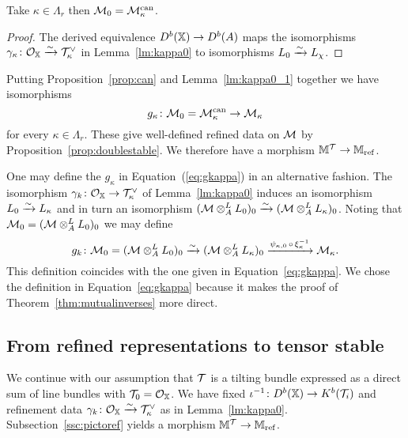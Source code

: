\documentclass[12pt]{amsart}
\begin{document}
\begin{lemma}\label{lm:kappa0_1}
Take $\kappa \in \Lambda_r$ then $\mathcal{M}_0 = \mathcal{M}_\kappa^\textup{can}$.
\end{lemma}

\begin{proof}
The derived equivalence $D^b(\mathbb{X}) \rightarrow D^b(A)$ maps 
the isomorphisms $\gamma_{\kappa} \colon \mathcal{O}_{\mathbb{X}} \xrightarrow{\sim}\mathcal{T}_\kappa^\vee$ in Lemma~\ref{lm:kappa0} to isomorphisms $L_0 \xrightarrow{\sim} L_{\chi}$.
\end{proof}

Putting Proposition~\ref{prop:can} and Lemma~\ref{lm:kappa0_1} together we have isomorphisms 
\begin{equation}\label{eq:gkappa}
g_\kappa \colon \mathcal{M}_0 = \mathcal{M}_\kappa^{\text{can}} \rightarrow \mathcal{M}_\kappa
\end{equation}
for every $\kappa \in \Lambda_r$.
These give well-defined refined data on $\mathcal{M}$  by Proposition~\ref{prop:doublestable}.
We therefore have a morphism $\mathbb{M}^{\mathcal{T}} \rightarrow \mathbb{M}_\text{ref}$.

\begin{remark}
One may define the $g_\kappa$ in Equation~(\ref{eq:gkappa}) in an alternative fashion.
The isomorphism $\gamma_k \colon \mathcal{O}_{\mathbb{X}} \rightarrow \mathcal{T}_\kappa^\vee$ of Lemma~\ref{lm:kappa0} induces an isomorphism $L_0 \xrightarrow{\sim} L_\kappa$ and in turn an isomorphism $(\mathcal{M} \otimes_A^L L_0)_0 \xrightarrow{\sim} (\mathcal{M} \otimes_A^L L_\kappa)_0$.
Noting that $\mathcal{M}_0 = (\mathcal{M} \otimes_A^L L_0)_0$ we may define $$g_k \colon \mathcal{M}_0 = (\mathcal{M} \otimes_A^L L_0)_0 \xrightarrow{\sim} (\mathcal{M} \otimes_A^L L_\kappa)_0 \xrightarrow{\psi_{\kappa,0} \,\circ\, \xi_{\kappa}^{-1}} \mathcal{M}_\kappa.$$
This definition coincides with the one given in Equation~\ref{eq:gkappa}.
We chose the definition in Equation~\ref{eq:gkappa} because it makes the proof of Theorem~\ref{thm:mutualinverses} more direct.
\end{remark}

\subsection{From refined representations to tensor stable} \label{ssec:reftopic}

We continue with our assumption that $\mathcal{T}$ is a tilting bundle expressed as a direct sum of line bundles with $\mathcal{T}_0 = \mathcal{O}_{\mathbb{X}}$. We have fixed $\iota^{-1} \colon D^b(\mathbb{X}) \rightarrow K^b(\mathcal{T}_i)$  and refinement data $\gamma_k\colon \mathcal{O}_{\mathbb{X}} \xrightarrow{\sim}\mathcal{T}_\kappa^\vee$ as in Lemma~\ref{lm:kappa0}. Subsection~\ref{ssc:pictoref} yields a morphism $\mathbb{M}^{\mathcal{T}} \to \mathbb{M}_{\textup{ref}}$. 
\end{document}
